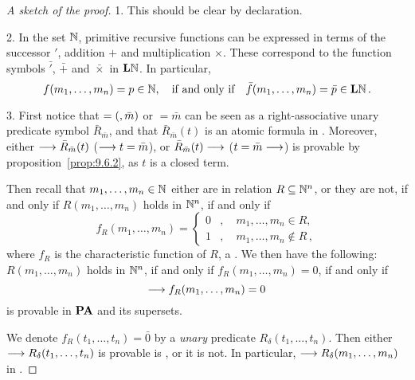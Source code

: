 \documentclass[11pt,a4paper]{article}
\begin{document}
\begin{proof}[A sketch of the proof]
\item[1.] This should be clear by declaration.

\item[2.]
    In the set \(\Nset\), primitive recursive functions can be expressed
    in terms of the successor \('\), addition \(+\) and multiplication \(\times\).
    These correspond to the function symbols \(\bar'\), \(\bar+\) and \(\bar\times\)
    in \(\LN\). In particular,
    \begin{equation*}
        f(m_1,\ldots,m_n)   = p\in\Nset,
        \quad\text{if and only if}\quad
        \bar f(m_1,\ldots,m_n) = \bar p \in\LN\,.
    \end{equation*}
\item[3.]
    First notice that \(=\arcs{,\bar m}\) or \(=\bar m\)
    can be seen as a right-associative unary predicate symbol
    \(\bar R_{\bar m}\), and that \(\bar R_{\bar m}(t)\)
    is an atomic formula in \PA{}. Moreover, either
    \(\seq\bar R_{\bar m}(t)\) (\(\seq t=\bar m\)),
    or \(\bar R_{\bar m}(t)\seq\) (\(t=\bar m\seq\))
    is provable by proposition~\ref{prop:9.6.2},
    as \(t\) is a closed term.

    Then recall that \(m_1,\ldots,m_n\in\Nset\) either are in relation
    \(R\subseteq\Nset^n\), or they are not, if and only if \(R(m_1,\ldots,m_n)\)
    holds in \(\Nset^n\), if and only if
    \begin{equation*}
        f_R(m_1,\ldots,m_n) = \left\{
            \begin{aligned}
                0&,\quad m_1,\ldots,m_n \in R,\\
                1&,\quad m_1,\ldots,m_n\notin R\,,
            \end{aligned}
        \right.
    \end{equation*}
    where \(f_R\) is the characteristic function of \(R\), a \PRF{}.
    We then have the following: \(R(m_1,\ldots,m_n)\) holds in \(\Nset^n\),
    if and only if \(f_R(m_1,\ldots,m_n) = 0\), if and only if
    \begin{equation*}
        \seq f_R(m_1,\ldots,m_n) = 0
    \end{equation*}
    is provable in \(\PA\) and its supersets.

    We denote \(f_R(t_1,\ldots,t_n) = \bar0\) by a \emph{unary} predicate
    \(R_\delta(t_1,\ldots,t_n)\). Then either \(\seq R_\delta(t_1,\ldots,t_n)\)
    is provable is \PA{}, or it is not. In particular,
    \(\seq R_\delta(m_1,\ldots,m_n)\) in \PA{}.
\end{proof}
\end{document}
